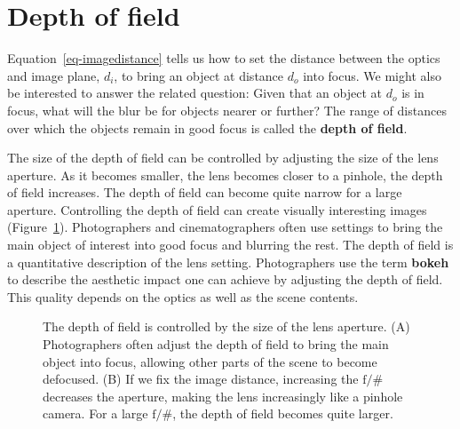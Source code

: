 \documentclass[
  letterpaper,
]{book}
\begin{document}
\section{Depth of field}\label{sec-optics-dof}

Equation~\ref{eq-imagedistance} tells us how to set the distance between
the optics and image plane, \(d_i\), to bring an object at distance
\(d_o\) into focus. We might also be interested to answer the related
question: Given that an object at \(d_o\) is in focus, what will the
blur be for objects nearer or further? The range of distances over which
the objects remain in good focus is called the \textbf{depth of field}.

The size of the depth of field can be controlled by adjusting the size
of the lens aperture. As it becomes smaller, the lens becomes closer to
a pinhole, the depth of field increases. The depth of field can become
quite narrow for a large aperture. Controlling the depth of field can
create visually interesting images (Figure~\ref{fig-optics-bokeh}).
Photographers and cinematographers often use settings to bring the main
object of interest into good focus and blurring the rest. The depth of
field is a quantitative description of the lens setting. Photographers
use the term \textbf{bokeh} to describe the aesthetic impact one can
achieve by adjusting the depth of field. This quality depends on the
optics as well as the scene contents.

\begin{figure}


\caption{\label{fig-optics-bokeh}The depth of field is controlled by the
size of the lens aperture. (A) Photographers often adjust the depth of
field to bring the main object into focus, allowing other parts of the
scene to become defocused. (B) If we fix the image distance, increasing
the \(\mathrm{f}/\#\) decreases the aperture, making the lens
increasingly like a pinhole camera. For a large \(\mathrm{f}/\#\), the
depth of field becomes quite larger.}

\end{figure}%
\end{document}
